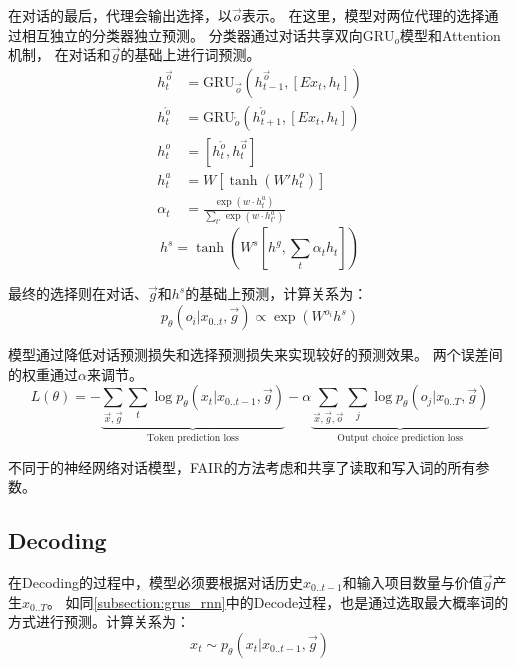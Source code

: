 在对话的最后，代理会输出选择，以$\vec{o}$表示。
在这里，模型对两位代理的选择通过相互独立的分类器独立预测。
分类器通过对话共享双向$\text{GRU}_o$模型和Attention机制\citep{BaarslagFujita-17}，
在对话和$\vec{g}$的基础上进行词预测。
\begin{align}
h^{\overrightarrow{o}}_t &= \text{GRU}_{\overrightarrow{o}}(h^{\overrightarrow{o}}_{t-1}, [Ex_{t}, h_t])\\
h^{\overleftarrow{o}}_t &= \text{GRU}_{\overleftarrow{o}}(h^{\overleftarrow{o}}_{t+1}, [Ex_{t}, h_t])\\
h^o_t&=[h^{\overleftarrow{o}}_t, h^{\overrightarrow{o}}_t]\\
h^a_t&=W[\tanh(W'h^o_t)]\\
\alpha_t &= \frac {\exp(w \cdot h^a_t)}{\sum_{t'} \exp(w\cdot h^a_{t'})}
\end{align}
\begin{equation}
h^s = \tanh(W^s[h^g, \sum_t \alpha_t h_t])
\end{equation}

最终的选择则在对话、$\vec{g}$和$h^s$的基础上预测，计算关系为：
\begin{equation}
p_\theta(o_i | x_{0..t}, \vec{g}) \propto \exp(W^{o_i} h^s)
\end{equation}

模型通过降低对话预测损失和选择预测损失来实现较好的预测效果。
两个误差间的权重通过$\alpha$来调节。
\begin{equation}
\label{eq:supervised}
L(\theta) = -\underbrace{\sum_{\vec{x},\vec{g}} \sum_{t} \log p_\theta(x_t | x_{0.. t-1}, \vec{g})}_{\text{Token prediction loss}} - \alpha \underbrace{\sum_{\vec{x},\vec{g},\vec{o}} \sum_{j} \log p_\theta(o_j | x_{0.. T}, \vec{g})}_{\text{Output choice prediction loss}}
\end{equation}

不同于\citet{VinyalsLe-19}的神经网络对话模型，FAIR的方法考虑和共享了读取和写入词的所有参数。

\subsection{Decoding}
\label{subsection:decoding}

在Decoding的过程中，模型必须要根据对话历史$x_{0..t-1}$和输入项目数量与价值$\vec{g}$产生$x_{0..T}$。
如同\ref{subsection:grus_rnn}中的Decode过程，也是通过选取最大概率词的方式进行预测。计算关系为：
\begin{equation}
 x_t \sim p_\theta(x_t | x_{0..t-1}, \vec{g})
\end{equation}

